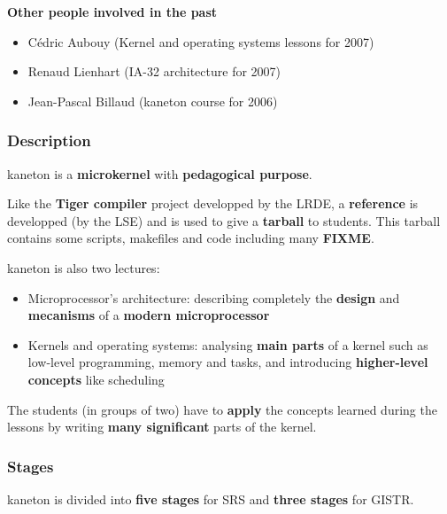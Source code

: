 {\begin{frame}
  \nl

  \textbf{Other people involved in the past}

  \begin{itemize}
    \item
      C\'{e}dric Aubouy (Kernel and operating systems lessons for 2007)
    \item
      Renaud Lienhart (IA-32 architecture for 2007)
    \item
      Jean-Pascal Billaud (kaneton course for 2006)
  \end{itemize}

\end{frame}


\begin{frame}
  \frametitle{Description}

  kaneton is a \textbf{microkernel} with \textbf{pedagogical purpose}.

  \-

  Like the \textbf{Tiger compiler} project developped by the LRDE, a
  \textbf{reference} is developped (by the LSE) and is used to give a
  \textbf{tarball} to students. This tarball contains some scripts,
  makefiles and code including many \textbf{FIXME}.

  \-

  kaneton is also two lectures:

  \begin{itemize}
    \item
    Microprocessor's architecture: describing completely the \textbf{design}
    and \textbf{mecanisms} of a \textbf{modern microprocessor}
    \item
    Kernels and operating systems: analysing \textbf{main parts} of a kernel
    such as low-level programming, memory and tasks, and introducing
    \textbf{higher-level concepts} like scheduling
  \end{itemize}

  \-

  The students (in groups of two) have to \textbf{apply} the concepts
  learned during the lessons by writing \textbf{many significant}
  parts of the kernel.

\end{frame}


\begin{frame}
  \frametitle{Stages}

  kaneton is divided into \textbf{five stages} for SRS and
  \textbf{three stages} for GISTR.


\end{frame}}
